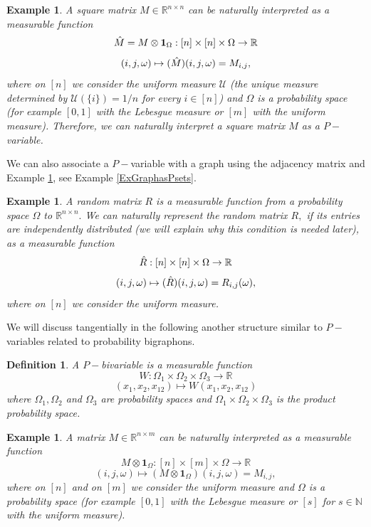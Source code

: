 \documentclass[11pt]{article}
\newtheorem{definition}[theorem]{Definition}
\newtheorem{example}[theorem]{Example}
\def\R{\mathbb{R}}
\def\N{\mathbb{N}}
\newcommand{\cU}{{\mathcal U}}  %
\begin{document}
\begin{example}\label{Examp:MatrixasPset}
A square matrix $M\in \R^{n\times n}$ can be naturally interpreted as a measurable function $$
\Hat{M}=M\otimes \mathbf{1}_{\Omega}:[n]\times [n]\times \Omega\rightarrow \R$$
$$
(i,j,\omega)\mapsto (\Hat{M})(i,j,\omega)=M_{i,j},
$$
where on $[n]$ we consider the uniform measure $\cU$ (the unique measure determined by $\cU(\{i\})=1/n$ for every $i\in [n]$) and $\Omega$ is a probability space (for example $[0,1]$ with the Lebesgue measure or $[m]$ with the uniform measure). Therefore, we can naturally interpret a square matrix $M$ as a $P-$variable.
\end{example}

We can also associate a $P-$variable with a graph using the adjacency matrix and Example \ref{Examp:MatrixasPset}, see Example \ref{ExGraphasPsets}.

\begin{example}\label{Examp:RandomMatrixPset}
A random matrix $R$ is a measurable function from a probability space $\Omega$ to $\R^{n\times n}.$ We can naturally represent the random matrix $R,$ if its entries are independently distributed (we will explain why this condition is needed later), as a measurable function
$$
\Hat{R}:[n]\times [n]\times \Omega\rightarrow \R
$$
  $$
(i,j,\omega)\mapsto (\Hat{R})(i,j,\omega)=R_{i,j}(\omega),
$$
where on $[n]$ we consider the uniform measure.
\end{example}


We will discuss tangentially in the following another structure similar to $P-$variables related to probability bigraphons. 

\begin{definition}\label{DefBBBiset}
A $P-$bivariable is a measurable function $$W:\Omega_1\times \Omega_2 \times \Omega_3\rightarrow \R$$
$$(x_1,x_2,x_{12})\mapsto W(x_1,x_2,x_{12})$$
where $\Omega_1,\Omega_2$ and $\Omega_3$ are probability spaces and $\Omega_1\times \Omega_2 \times \Omega_3$ is the product probability space.
\end{definition}


\begin{example}\label{Examp:RectangMatrixPsets}
A matrix $M\in \R^{n\times m}$ can be naturally interpreted as a measurable function $$
M\otimes \mathbf{1}_{\Omega}:[n]\times [m]\times \Omega\rightarrow \R$$
$$
(i,j,\omega)\mapsto (M\otimes \mathbf{1}_{\Omega})(i,j,\omega)=M_{i,j},
$$
where on $[n]$ and on $[m]$ we consider the uniform measure and $\Omega$ is a probability space (for example $[0,1]$ with the Lebesgue measure or $[s]$ for $s\in \N$ with the uniform measure).
\end{example}
\end{document}
